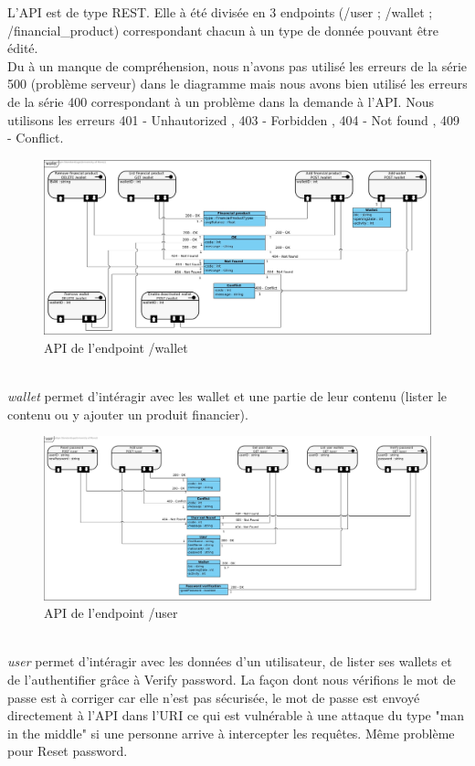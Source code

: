 \documentclass[../rapport.tex]{subfiles}
\begin{document}
L'API est de type REST. Elle à été divisée en 3 endpoints (/user ; /wallet ; /financial\_product) correspondant chacun à un type de donnée pouvant être édité. \\ 
Du à un manque de compréhension, nous n'avons pas utilisé les erreurs de la série 500 (problème serveur) dans le diagramme mais nous avons bien utilisé les erreurs de la série 400 correspondant à un problème dans la demande à l'API. Nous utilisons les erreurs 401 - Unhautorized , 403 - Forbidden , 404 - Not found , 409 - Conflict.

\begin{figure}[H]
    \includegraphics[scale=0.288]{ressources/photos_diagrammes/API/wallet.jpg}
    \caption{API de l'endpoint /wallet}
\end{figure}
\textit{\\wallet} permet d'intéragir avec les wallet et une partie de leur contenu (lister le contenu ou y ajouter un produit financier).

\begin{figure}[H]
    \includegraphics[scale=0.26]{ressources/photos_diagrammes/API/user.jpg}
    \caption{API de l'endpoint /user}
\end{figure}
\textit{\\user} permet d'intéragir avec les données d'un utilisateur, de lister ses wallets et de l'authentifier grâce à Verify password. La façon dont nous vérifions le mot de passe est à corriger car elle n'est pas sécurisée, le mot de passe est envoyé directement à l'API dans l'URI ce qui est vulnérable à une attaque du type "man in the middle" si une personne arrive à intercepter les requêtes. Même problème pour Reset password.
\end{document}
